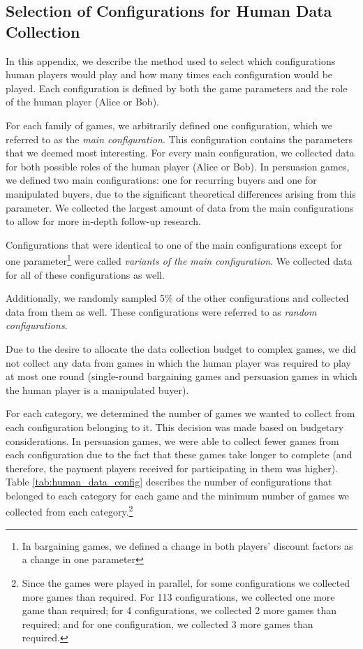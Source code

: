 \subsection{Selection of Configurations for Human Data Collection}
\label{app:human_configs}
In this appendix, we describe the method used to select which configurations human players would play and how many times each configuration would be played. Each configuration is defined by both the game parameters and the role of the human player (Alice or Bob).

For each family of games, we arbitrarily defined one configuration, which we referred to as the \textit{main configuration}. This configuration contains the parameters that we deemed most interesting. For every main configuration, we collected data for both possible roles of the human player (Alice or Bob). In persuasion games, we defined two main configurations: one for recurring buyers and one for manipulated buyers, due to the significant theoretical differences arising from this parameter. We collected the largest amount of data from the main configurations to allow for more in-depth follow-up research.

Configurations that were identical to one of the main configurations except for one parameter\footnote{In bargaining games, we defined a change in both players' discount factors as a change in one parameter} were called \textit{variants of the main configuration}. We collected data for all of these configurations as well.

Additionally, we randomly sampled 5\% of the other configurations and collected data from them as well. These configurations were referred to as \textit{random configurations}.

Due to the desire to allocate the data collection budget to complex games, we did not collect any data from games in which the human player was required to play at most one round (single-round bargaining games and persuasion games in which the human player is a manipulated buyer).

For each category, we determined the number of games we wanted to collect from each configuration belonging to it. This decision was made based on budgetary considerations. In persuasion games, we were able to collect fewer games from each configuration due to the fact that these games take longer to complete (and therefore, the payment players received for participating in them was higher). Table \ref{tab:human_data_config} describes the number of configurations that belonged to each category for each game and the minimum number of games we collected from each category.\footnote{Since the games were played in parallel, for some configurations we collected more games than required. For 113 configurations, we collected one more game than required; for 4 configurations, we collected 2 more games than required; and for one configuration, we collected 3 more games than required.}

